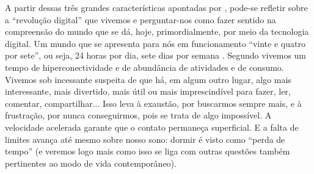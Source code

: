 A partir dessas três grandes características apontadas por \textcite{lash2012}, pode-se refletir sobre a “revolução digital” que vivemos e perguntar-nos como fazer sentido na compreensão do mundo que se dá, hoje, primordialmente, por meio da tecnologia digital. Um mundo que se apresenta para nós em funcionamento “vinte e quatro por sete”, ou seja, 24 horas por dia, sete dias por semana \cite{crary}. Segundo \textcite{sibilia2020} vivemos um tempo de hiperconectividade e de abundância de atividades e de consumo. Vivemos sob incessante suspeita de que há, em algum outro lugar, algo mais interessante, mais divertido, mais útil ou mais imprescindível para fazer, ler, comentar, compartilhar... Isso leva à exaustão, por buscarmos sempre mais, e à frustração, por nunca conseguirmos, pois se trata de algo impossível. A velocidade acelerada garante que o contato permaneça superficial. E a falta de limites avança até mesmo sobre nosso sono: dormir é visto como “perda de tempo” (e veremos logo mais como isso se liga com outras questões também pertinentes ao modo de vida contemporâneo).
